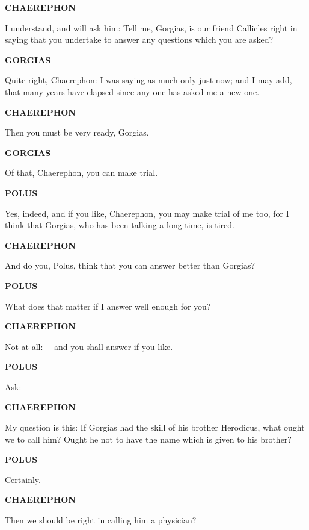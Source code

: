 \documentclass[11pt,letter]{article}
\begin{document}
\par \textbf{CHAEREPHON}
\par   I understand, and will ask him:  Tell me, Gorgias, is our friend Callicles right in saying that you undertake to answer any questions which you are asked?

\par \textbf{GORGIAS}
\par   Quite right, Chaerephon:  I was saying as much only just now; and I may add, that many years have elapsed since any one has asked me a new one.

\par \textbf{CHAEREPHON}
\par   Then you must be very ready, Gorgias.

\par \textbf{GORGIAS}
\par   Of that, Chaerephon, you can make trial.

\par \textbf{POLUS}
\par   Yes, indeed, and if you like, Chaerephon, you may make trial of me too, for I think that Gorgias, who has been talking a long time, is tired.

\par \textbf{CHAEREPHON}
\par   And do you, Polus, think that you can answer better than Gorgias?

\par \textbf{POLUS}
\par   What does that matter if I answer well enough for you?

\par \textbf{CHAEREPHON}
\par   Not at all: —and you shall answer if you like.

\par \textbf{POLUS}
\par   Ask: —

\par \textbf{CHAEREPHON}
\par   My question is this:  If Gorgias had the skill of his brother Herodicus, what ought we to call him? Ought he not to have the name which is given to his brother?

\par \textbf{POLUS}
\par   Certainly.

\par \textbf{CHAEREPHON}
\par   Then we should be right in calling him a physician?
\end{document}
